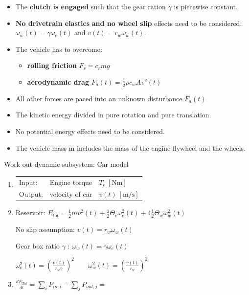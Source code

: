 \documentclass[10pt,a4paper]{scrartcl}
\begin{document}
\begin{multicols*}{3}

\begin{itemize}
\item The \textbf{clutch is engaged} such that the gear ration $\gamma$ is piecewise constant.
\item \textbf{No drivetrain elastics} \textbf{and no wheel slip} effects need to be considered. $\omega_w (t)=\gamma \omega_e(t)$ and $v(t)=r_{w}\omega_w(t)$.
\item The vehicle has to overcome:
\begin{itemize}
\item \textbf{rolling friction} $F_r=c_rmg$
\item \textbf{aerodynamic drag} $F_a(t)=\frac{1}{2}\rho c_w Av^2(t)$
\end{itemize}
\item All other forces are paced into an unknown disturbance $F_d(t)$
\item The kinetic energy divided in pure rotation and pure translation.
\item No potential energy effects need to be considered.
\item The vehicle mass m includes the mass of the engine flywheel and the wheels.
\end{itemize}


Work out dynamic subsystem: Car model
\begin{enumerate}
\item \begin{tabular}{lll}Input: & Engine torque & $T_e\ [\si{\newton\meter}]$\\
Output: & velocity of car & $v(t)\ [\si{\meter\per\second}]$ \end{tabular}
\item Reservoir: $E_{tot}=\frac{1}{2}mv^2(t)+\frac{1}{2}\Theta_e\omega_e^2(t)+4\frac{1}{2}\Theta_w\omega_w^2(t)$

No slip assumption: $v(t)=r_w\omega_w(t)$

Gear box ratio $\gamma$ : $\omega_w(t)=\gamma\omega_e(t)$

$\omega_e^2(t)=\left(\frac{v(t)}{r_w\gamma}\right)^2\qquad \omega_w^2(t)=\left(\frac{v(t)}{r_w}\right)^2$


\item $\frac{dE_{Tot}}{dt}=\sum\limits_iP_{in,i}-\sum\limits_jP_{out,j}=$


\end{enumerate}
\end{multicols*}
\end{document}
